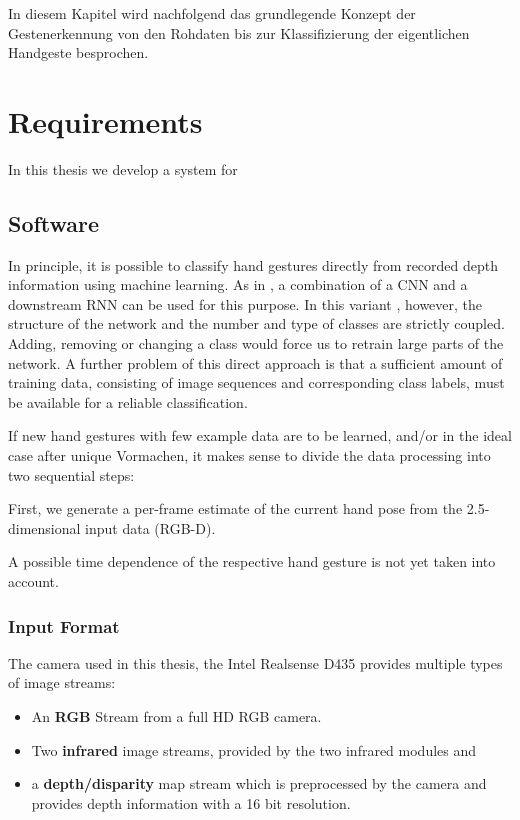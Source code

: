 In diesem Kapitel wird nachfolgend das grundlegende Konzept der Gestenerkennung von den Rohdaten bis zur Klassifizierung der eigentlichen Handgeste besprochen.

\section{Requirements}
In this thesis we develop a system for 

\subsection{Software}
In principle, it is possible to classify hand gestures directly from recorded depth information using machine learning. As in \cite{Molchanov2016}, a combination of a CNN and a downstream RNN can be used for this purpose. In this variant , however, the structure of the network and the number and type of classes are strictly coupled. Adding, removing or changing a class would force us to retrain large parts of the network.
A further problem of this direct approach is that a sufficient amount of training data, consisting of image sequences and corresponding class labels, must be available for a reliable classification.

If new hand gestures with few example data are to be learned, and/or in the ideal case after unique Vormachen, it makes sense to divide the data processing into two sequential steps:

First, we generate a per-frame estimate of the current hand pose from the 2.5-dimensional input data (RGB-D). 


A possible time dependence of the respective hand gesture is not yet taken into account. 

\subsubsection{Input Format}
The camera used in this thesis, the Intel Realsense D435 provides multiple types of image streams:

\begin{itemize}
	\item An \textbf{RGB} Stream from a full HD RGB camera. 
	\item Two \textbf{infrared} image streams, provided by the two infrared modules and
	\item a \textbf{depth/disparity} map stream which is preprocessed by the camera and provides depth information with a 16 bit resolution.
\end{itemize}

